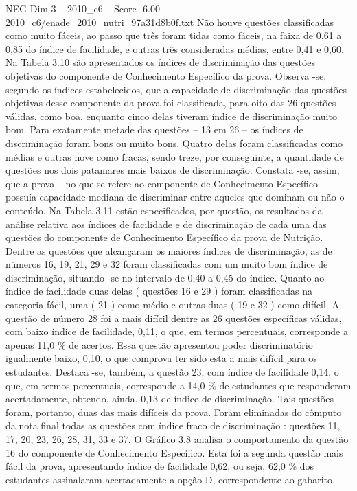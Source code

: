 \begin{textsample}{NEG Dim 3 – 2010\_c6 – Score -6.00 – 2010\_c6/enade\_2010\_nutri\_97a31d8b0f.txt}
Não houve questões classificadas como muito fáceis, ao passo que três foram tidas como fáceis, na faixa de 0,61 a 0,85 do índice de facilidade, e outras três consideradas médias, entre 0,41 e 0,60.
Na Tabela 3.10 são apresentados os índices de discriminação das questões objetivas do componente de Conhecimento Específico da prova.
Observa -se, segundo os índices estabelecidos, que a capacidade de discriminação das questões objetivas desse componente da prova foi classificada, para oito das 26 questões válidas, como boa, enquanto cinco delas tiveram índice de discriminação muito bom.
Para exatamente metade das questões – 13 em 26 – os índices de discriminação foram bons ou muito bons.
Quatro delas foram classificadas como médias e outras nove como fracas, sendo treze, por conseguinte, a quantidade de questões nos dois patamares mais baixos de discriminação.
Constata -se, assim, que a prova – no que se refere ao componente de Conhecimento Específico – possuía capacidade mediana de discriminar entre aqueles que dominam ou não o conteúdo.
Na Tabela 3.11 estão especificados, por questão, os resultados da análise relativa aos índices de facilidade e de discriminação de cada uma das questões do componente de Conhecimento Específico da prova de Nutrição.
Dentre as questões que alcançaram os maiores índices de discriminação, as de números 16, 19, 21, 29 e 32 foram classificadas com um muito bom índice de discriminação, situando -se no intervalo de 0,40 a 0,45 do índice.
Quanto ao índice de facilidade duas delas ( questões 16 e 29 ) foram classificadas na categoria fácil, uma ( 21 ) como médio e outras duas ( 19 e 32 ) como difícil.
A questão de número 28 foi a mais difícil dentre as 26 questões específicas válidas, com baixo índice de facilidade, 0,11, o que, em termos percentuais, corresponde a apenas 11,0 \% de acertos.
Essa questão apresentou poder discriminatório igualmente baixo, 0,10, o que comprova ter sido esta a mais difícil para os estudantes.
Destaca -se, também, a questão 23, com índice de facilidade 0,14, o que, em termos percentuais, corresponde a 14,0 \% de estudantes que responderam acertadamente, obtendo, ainda, 0,13 de índice de discriminação.
Tais questões foram, portanto, duas das mais difíceis da prova.
Foram eliminadas do cômputo da nota final todas as questões com índice fraco de discriminação : questões 11, 17, 20, 23, 26, 28, 31, 33 e 37.
O Gráfico 3.8 analisa o comportamento da questão 16 do componente de Conhecimento Específico.
Esta foi a segunda questão mais fácil da prova, apresentando índice de facilidade 0,62, ou seja, 62,0 \% dos estudantes assinalaram acertadamente a opção D, correspondente ao gabarito.

\end{textsample}

